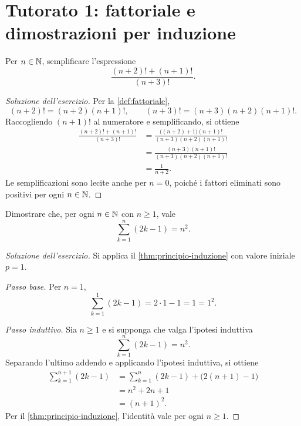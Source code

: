 \section[Tutorato 1 --- 8 ottobre 2026]{Tutorato 1: fattoriale e dimostrazioni per induzione}
\label{chap:tutorato-01}

\begin{exercise}
\label{ex:tutorato01-rapporto-fattoriali}
Per \(n\in\mathbb{N}\), semplificare l'espressione
\[
  \frac{(n+2)!+(n+1)!}{(n+3)!}.
\]
\end{exercise}

\begin{proof}[Soluzione dell'esercizio]
Per la \cref{def:fattoriale},
\[
  (n+2)!=(n+2)(n+1)!,
  \qquad
  (n+3)!=(n+3)(n+2)(n+1)!.
\]
Raccogliendo \((n+1)!\) al numeratore e semplificando, si ottiene
\begin{align*}
  \frac{(n+2)!+(n+1)!}{(n+3)!}
    &=\frac{\bigl((n+2)+1\bigr)(n+1)!}
      {(n+3)(n+2)(n+1)!}\\
    &=\frac{(n+3)(n+1)!}{(n+3)(n+2)(n+1)!}\\
    &=\frac{1}{n+2}.
\end{align*}
Le semplificazioni sono lecite anche per \(n=0\), poiché i
fattori eliminati sono positivi per ogni \(n\in\mathbb{N}\).
\end{proof}

\begin{exercise}
\label{ex:tutorato01-somma-dispari}
Dimostrare che, per ogni \(n\in\mathbb{N}\) con \(n\ge1\), vale
\[
  \sum_{k=1}^{n}(2k-1)=n^2.
\]
\end{exercise}

\begin{proof}[Soluzione dell'esercizio]
Si applica il \cref{thm:principio-induzione} con valore
iniziale \(p=1\).

\emph{Passo base.}
Per \(n=1\),
\[
  \sum_{k=1}^{1}(2k-1)=2\cdot1-1=1=1^2.
\]

\emph{Passo induttivo.}
Sia \(n\ge1\) e si supponga che valga l'ipotesi induttiva
\[
  \sum_{k=1}^{n}(2k-1)=n^2.
\]
Separando l'ultimo addendo e applicando l'ipotesi induttiva,
si ottiene
\begin{align*}
  \sum_{k=1}^{n+1}(2k-1)
    &=\sum_{k=1}^{n}(2k-1)+\bigl(2(n+1)-1\bigr)\\
    &=n^2+2n+1\\
    &=(n+1)^2.
\end{align*}
Per il \cref{thm:principio-induzione}, l'identità vale per
ogni \(n\ge1\).
\end{proof}

